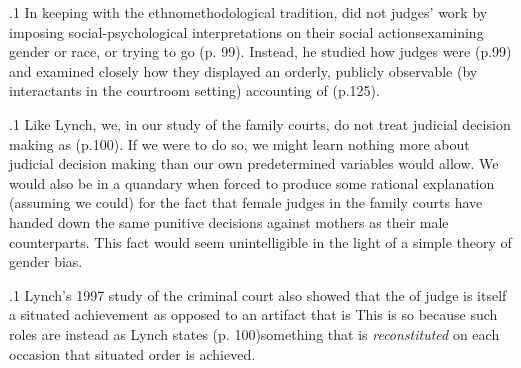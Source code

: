 \documentclass[11pt, twoside]{article}
\newcommand{\myuline}[1]{%
  \uline{\phantom{#1}}%
  \llap{\contour{white}{#1}}%
}
\begin{document}
{


\p.1{%
\spindexmark{}In keeping with the ethnomethodological tradition, 
\textcolor{b2}{\secondaryindexmark{}\myuline{Lynch}} did not
 judges’ work by imposing social-psychological interpretations on their social actions\mdash{}examining gender or race, or trying to go
 (p. 99). Instead, he studied how judges were  (p.\@ 99) and examined closely
how they displayed an orderly, publicly observable (by interactants in
the courtroom setting) accounting of  (p.\hspace{1pt}125).\epindexmark{}
}

\p.1{%
Like Lynch, we, in our study of the family courts, do not treat judicial decision making as  (p.\@ 100). If we were to do so, we might
learn nothing more about judicial decision making than our own predetermined variables would allow. We would also be in a quandary when
forced to produce some rational explanation (assuming we could) for
the fact that female judges in the family courts have handed down the
same punitive decisions against mothers as their male counterparts. This
fact would seem unintelligible in the light of a simple theory of gender
bias.
}%

\p.1{%
Lynch’s 1997 study of the criminal court also showed that the 
of judge is itself a situated achievement as opposed to an artifact that is
 This is so because such
roles are instead as Lynch states  (p. 100)\mdash{}something that is \textit{reconstituted} on
each occasion that situated order is achieved.
}%

}
\end{document}
